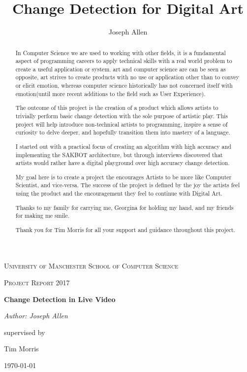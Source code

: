 \documentclass[a4paper]{report}
\title{Change Detection for Digital Art}
\author{Joseph Allen}
\begin{document}
\begin{titlepage}
	\centering
	{\scshape\LARGE University of Manchester School of Computer Science \par}
	\vspace{1cm}
	{\scshape\Large Project Report 2017\par}
	\vspace{1.5cm}
	{\huge\bfseries Change Detection in Live Video\par}
	\vspace{2cm}
	{\Large\itshape Author: Joseph Allen\par}
	supervised by\par
	Tim Morris

	\vfill

	{\large \today\par}
\end{titlepage}

\begin{abstract}
In Computer Science we are used to working with other fields, it is a fundamental aspect of programming careers to apply technical skills with a real world problem to create a useful application or system. art and computer science are can be seen as opposite, art strives to create products with no use or application other than to convey or elicit emotion, whereas computer science historically has not concerned itself with emotion(until more recent additions to the field such as User Experience). 

The outcome of this project is the creation of a product which allows artists to trivially perform basic change detection with the sole purpose of artistic play. This project will help introduce non-technical artists to programming, inspire a sense of curiosity to delve deeper, and hopefully transition them into mastery of a language.

I started out with a practical focus of creating an algorithm with high accuracy and implementing the SAKBOT architecture, but through interviews discovered that artists would rather have a digital playground over high accuracy change detection.

My goal here is to create a project the encourages Artists to be more like Computer Scientist, and vice-versa. The success of the project is defined by the joy the artists feel using the product and the encouragement they feel to continue with Digital Art.
\end{abstract}

\renewcommand{\abstractname}{Acknowledgements}
\begin{abstract}
Thanks to my family for carrying me, Georgina for holding my hand, and my friends for making me smile.

Thank you for Tim Morris for all your support and guidance throughout this project.
\end{abstract}
\end{document}
